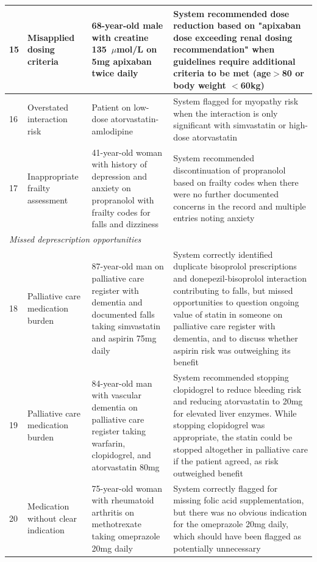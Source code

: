 {\begin{longtable}{p{}p{}p{}p{}}
                \hypertarget{vignette-15}{15} & Misapplied dosing criteria & 68-year-old male with creatine 135~$\mu$mol/L on 5mg apixaban twice daily & System recommended dose reduction based on "apixaban dose exceeding renal dosing recommendation"  when guidelines require additional criteria to be met (age$>$80 or body weight $<$60kg) \\
                \midrule
                \hypertarget{vignette-16}{16} & Overstated interaction risk & Patient on low-dose atorvastatin-amlodipine & System flagged for myopathy risk when the interaction is only significant with simvastatin or high-dose atorvastatin \\
                \midrule
                \hypertarget{vignette-17}{17} & Inappropriate frailty assessment & 41-year-old woman with history of depression and anxiety on propranolol with frailty codes for falls and dizziness & System recommended discontinuation of propranolol based on frailty codes when there were no further documented concerns in the record and multiple entries noting anxiety \\
                \midrule
                \multicolumn{4}{l}{\textit{Missed deprescription opportunities}} \\
                \midrule
                \hypertarget{vignette-18}{18} & Palliative care medication burden & 87-year-old man on palliative care register with dementia and documented falls taking simvastatin and aspirin 75mg daily & System correctly identified duplicate bisoprolol prescriptions and donepezil-bisoprolol interaction contributing to falls, but missed opportunities to question ongoing value of statin in someone on palliative care register with dementia, and to discuss whether aspirin risk was outweighing its benefit \\
                \midrule
                \hypertarget{vignette-19}{19} & Palliative care medication burden & 84-year-old man with vascular dementia on palliative care register taking warfarin, clopidogrel, and atorvastatin 80mg & System recommended stopping clopidogrel to reduce bleeding risk and reducing atorvastatin to 20mg for elevated liver enzymes. While stopping clopidogrel was appropriate, the statin could be stopped altogether in palliative care if the patient agreed, as risk outweighed benefit \\
                \midrule
                \hypertarget{vignette-20}{20} & Medication without clear indication & 75-year-old woman with rheumatoid arthritis on methotrexate taking omeprazole 20mg daily & System correctly flagged for missing folic acid supplementation, but there was no obvious indication for the omeprazole 20mg daily, which should have been flagged as potentially unnecessary \\

\end{longtable}}
